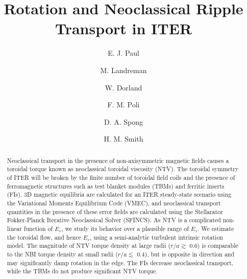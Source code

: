 \documentclass[aip, pop, preprint]{revtex4-1}
\numberwithin{figure}{section}
\numberwithin{equation}{section}
\begin{document}
\title{Rotation and Neoclassical Ripple Transport in ITER}
\author{E. J. Paul}

\author{M. Landreman}

\author{W. Dorland}

\author{F. M. Poli}

\author{D. A. Spong}

\author{H. M. Smith}

\begin{abstract}

Neoclassical transport in the presence of non-axisymmetric magnetic fields causes a toroidal torque known as neoclassical toroidal viscosity (NTV). The toroidal symmetry of ITER will be broken by the finite number of toroidal field coils and the presence of ferromagnetic structures such as test blanket modules (TBMs) and ferritic inserts (FIs). 3D magnetic equilibria are calculated for an ITER steady-state scenario using the Variational Moments Equilibrium Code (VMEC), and neoclassical transport quantities in the presence of these error fields are calculated using the Stellarator Fokker-Planck Iterative Neoclassical Solver (SFINCS). As NTV is a complicated non-linear function of $E_r$, we study its behavior over a plausible range of $E_r$. We estimate the toroidal flow, and hence $E_r$, using a semi-analytic turbulent intrinsic rotation model. The magnitude of NTV torque density at large radii ($r/a \gtrsim$ 0.6) is comparable to the NBI torque density at small radii ($r/a \lesssim$ 0.4), but is opposite in direction and may significantly damp rotation in the edge. The FIs decrease neoclassical transport, while the TBMs do not produce significant NTV torque. 
\end{abstract}

\maketitle
\end{document}
